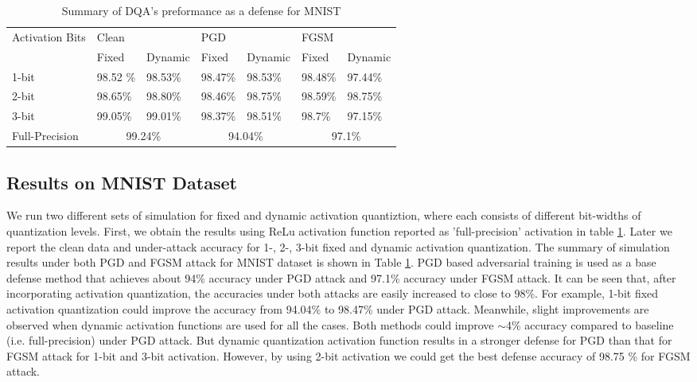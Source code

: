\documentclass{article}
\begin{document}
\begin{table}[ht]
\begin{tabular}{|l|l|l|l|l|l|l|}
\hline
\multirow{2}{*}{Activation Bits} & \multicolumn{2}{l|}{Clean} & \multicolumn{2}{l|}{PGD} & \multicolumn{2}{l|}{FGSM} \\ \cline{2-7} 
 & Fixed & Dynamic & Fixed & Dynamic & Fixed & Dynamic \\ \hline
1-bit & 98.52 \% & 98.53\% & 98.47\% & 98.53\% & 98.48\% & 97.44\% \\ \hline
2-bit & 98.65\% & 98.80\% & 98.46\% & 98.75\% & 98.59\% & 98.75\% \\ \hline
3-bit & 99.05\% & 99.01\% & 98.37\% & 98.51\% & 98.7\% & 97.15\% \\ \hline
Full-Precision & \multicolumn{2}{c|}{99.24\%} & \multicolumn{2}{c|}{94.04\%} & \multicolumn{2}{c|}{97.1\%} \\ \hline
\end{tabular}
\centering
\caption{Summary of DQA's preformance as a defense for MNIST}
\label{tab:2}
\end{table}




\subsection{Results on MNIST Dataset}
We run two different sets of simulation for fixed and dynamic activation quantiztion, where each consists of different bit-widths of quantization levels. First, we obtain the results using ReLu activation function reported as 'full-precision' activation in table \ref{tab:2}. Later we report the clean data and under-attack accuracy for 1-, 2-, 3-bit fixed and dynamic activation quantization. The summary of simulation results under both PGD and FGSM attack for MNIST dataset is shown in Table \ref{tab:2}. PGD based adversarial training is used as a base defense method that achieves about 94\% accuracy under PGD attack and 97.1\% accuracy under FGSM attack. It can be seen that, after incorporating activation quantization, the accuracies under both attacks are easily increased to close to 98\%. For example, 1-bit fixed activation quantization could improve the accuracy from 94.04\% to 98.47\% under PGD attack. Meanwhile, slight improvements are observed when dynamic activation functions are used for all the cases. Both methods could improve $\sim$4\% accuracy compared to baseline (i.e. full-precision) under PGD attack. But dynamic quantization activation function results in a stronger defense for PGD than that for FGSM attack for 1-bit and 3-bit activation. However, by using 2-bit activation we could get the best defense accuracy of 98.75 \%  for FGSM attack. 
\end{document}
